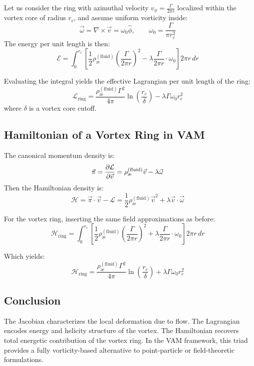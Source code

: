     Let us consider the ring with azimuthal velocity $v_\phi = \frac{\Gamma}{2\pi r}$ localized within the vortex core of radius $r_c$, and assume uniform vorticity inside:
    \begin{equation}
        \vec{\omega} = \nabla \times \vec{v} = \omega_0\hat{\phi}, \qquad \omega_0 = \frac{\Gamma}{\pi r_c^2}
    \end{equation}
    The energy per unit length is then:
    \begin{equation}
        \mathcal{E} = \int_0^{r_c} \left[ \frac{1}{2} \rho_\text{\ae}^{(\text{fluid})} \left( \frac{\Gamma}{2\pi r} \right)^2 - \lambda \frac{\Gamma}{2\pi r} \cdot \omega_0 \right] 2\pi r \, dr
    \end{equation}

    Evaluating the integral yields the effective Lagrangian per unit length of the ring:
    \begin{equation}
        \mathcal{L}_\text{ring} = \frac{\rho_\text{\ae}^{(\text{fluid})} \Gamma^2}{4\pi} \ln\left( \frac{r_c}{\delta} \right) - \lambda \Gamma \omega_0 r_c^2
    \end{equation}
    where $\delta$ is a vortex core cutoff.

    \subsection{Hamiltonian of a Vortex Ring in VAM}
    The canonical momentum density is:
    \begin{equation}
        \vec{\pi} = \pdv{\mathcal{L}}{\vec{v}} = \rho_\text{\ae}^{(\text{fluid})} \vec{v} - \lambda \vec{\omega}
    \end{equation}
    Then the Hamiltonian density is:
    \begin{equation}
        \mathcal{H} = \vec{\pi} \cdot \vec{v} - \mathcal{L} = \frac{1}{2} \rho_\text{\ae}^{(\text{fluid})} \vec{v}^2 + \lambda \vec{v} \cdot \vec{\omega}
    \end{equation}

    For the vortex ring, inserting the same field approximations as before:
    \begin{equation}
        \mathcal{H}_\text{ring} = \int_0^{r_c} \left[ \frac{1}{2} \rho_\text{\ae}^{(\text{fluid})} \left( \frac{\Gamma}{2\pi r} \right)^2 + \lambda \frac{\Gamma}{2\pi r} \cdot \omega_0 \right] 2\pi r \, dr
    \end{equation}

    Which yields:
    \begin{equation}
        \mathcal{H}_\text{ring} = \frac{\rho_\text{\ae}^{(\text{fluid})} \Gamma^2}{4\pi} \ln\left( \frac{r_c}{\delta} \right) + \lambda \Gamma \omega_0 r_c^2
    \end{equation}

    \subsection{Conclusion}
    The Jacobian characterizes the local deformation due to flow. The Lagrangian encodes energy and helicity structure of the vortex. The Hamiltonian recovers total energetic contribution of the vortex ring. In the VAM framework, this triad provides a fully vorticity-based alternative to point-particle or field-theoretic formulations.